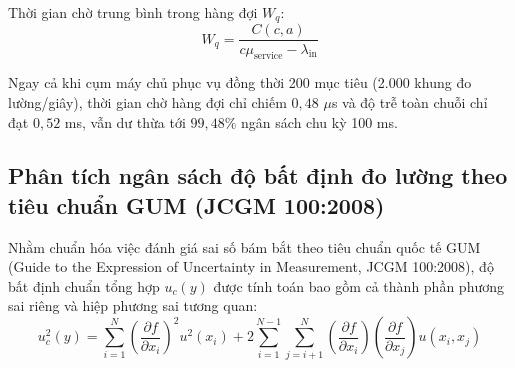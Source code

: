 Thời gian chờ trung bình trong hàng đợi $W_q$:
\begin{equation}
W_q = \frac{C(c, a)}{c \mu_{\text{service}} - \lambda_{\text{in}}}
\label{eq:erlang-queue-waiting-time}
\end{equation}

\begin{table}[H]
\centering
\caption{Đo đạc xác suất chờ và thời gian trễ hàng đợi Erlang-C theo quy mô trạm quan sát}
\label{tab:erlang-c-queueing-metrics}
\end{table}

Ngay cả khi cụm máy chủ phục vụ đồng thời 200 mục tiêu (2.000 khung đo lường/giây), thời gian chờ hàng đợi chỉ chiếm $0{,}48$ $\mu$s và độ trễ toàn chuỗi chỉ đạt $0{,}52$ ms, vẫn dư thừa tới $99{,}48\%$ ngân sách chu kỳ 100 ms.

\subsection{Phân tích ngân sách độ bất định đo lường theo tiêu chuẩn GUM (JCGM 100:2008)}

\hspace{0.5cm} Nhằm chuẩn hóa việc đánh giá sai số bám bắt theo tiêu chuẩn quốc tế GUM (Guide to the Expression of Uncertainty in Measurement, JCGM 100:2008), độ bất định chuẩn tổng hợp $u_c(y)$ được tính toán bao gồm cả thành phần phương sai riêng và hiệp phương sai tương quan:
\begin{equation}
u_c^2(y) = \sum_{i=1}^N \left( \frac{\partial f}{\partial x_i} \right)^2 u^2(x_i) + 2 \sum_{i=1}^{N-1} \sum_{j=i+1}^N \left( \frac{\partial f}{\partial x_i} \right) \left( \frac{\partial f}{\partial x_j} \right) u(x_i, x_j)
\label{eq:gum-combined-uncertainty-formula}
\end{equation}

